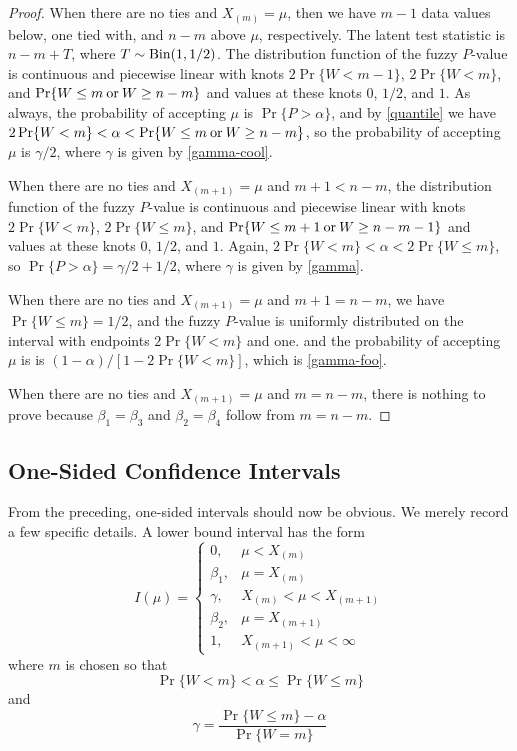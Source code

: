 \documentclass{article}
\newcommand{\BinomialDis}{\text{\upshape Bin}}
\newcommand{\opor}{\mathbin{\rm or}}
\begin{document}
\begin{proof}
When there are no ties and $X_{(m)} = \mu$,
then we have $m - 1$ data values below, one tied with, and $n - m$
above $\mu$, respectively.
The latent test statistic is $n - m + T$,
where $T \sim \BinomialDis(1, 1 / 2)$.
The distribution function of the fuzzy $P$-value is continuous and
piecewise linear with knots $2 \Pr \{ W < m - 1 \}$, $2 \Pr \{ W < m \}$,
and $\Pr \{ W \le m \opor W \ge n - m \}$ and values at these knots
$0$, $1 / 2$, and $1$.
As always, the probability of accepting $\mu$ is $\Pr \{ P > \alpha \}$,
and by \eqref{quantile} we have
$2 \Pr \{ W < m \} < \alpha < \Pr \{ W \le m \opor W \ge n - m \}$,
so the probability of accepting $\mu$ is $\gamma / 2$, where
$\gamma$ is given by \eqref{gamma-cool}.

When there are no ties and $X_{(m + 1)} = \mu$
and $m + 1 < n - m$,
the distribution function of the fuzzy $P$-value is continuous and
piecewise linear with knots $2 \Pr \{ W < m \}$, $2 \Pr \{ W \le m \}$,
and $\Pr \{ W \le m + 1 \opor W \ge n - m - 1 \}$ and values at these knots
$0$, $1 / 2$, and $1$.
Again, $2 \Pr \{ W < m \} < \alpha < 2 \Pr \{ W \le m \}$,
so $\Pr \{ P > \alpha \} = \gamma / 2 + 1 / 2$,
where $\gamma$ is given by \eqref{gamma}.

When there are no ties and $X_{(m + 1)} = \mu$
and $m + 1 = n - m$, we have $\Pr \{ W \le m \} = 1 / 2$,
and the fuzzy $P$-value is uniformly distributed on the interval
with endpoints $2 \Pr \{ W < m \}$ and one.
and the probability of accepting $\mu$ is
is $(1 - \alpha) / [1 - 2 \Pr\{W < m\}]$, which is \eqref{gamma-foo}.

When there are no ties and $X_{(m + 1)} = \mu$
and $m = n - m$, there is nothing to prove because $\beta_1 = \beta_3$
and $\beta_2 = \beta_4$ follow from $m = n - m$.
\end{proof}

\subsection{One-Sided Confidence Intervals}

From the preceding, one-sided intervals should now be obvious.
We merely record a few specific details.  A lower bound interval
has the form
\begin{equation} \label{non-degenerate-low}
   I(\mu)
   =
   \begin{cases}
   0, & \mu < X_{(m)}
   \\
   \beta_1, & \mu = X_{(m)}
   \\
   \gamma, & X_{(m)} < \mu < X_{(m + 1)}
   \\
   \beta_2, & \mu = X_{(m + 1)}
   \\
   1, & X_{(m + 1)} < \mu < \infty
   \end{cases}
\end{equation}
where $m$ is chosen so that
\begin{equation} \label{quantile-low}
   \Pr \{ W < m \} < \alpha \le \Pr \{ W \le m \}
\end{equation}
and
\begin{equation} \label{gamma-low}
   \gamma = \frac{\Pr \{ W \le m \} - \alpha}{\Pr \{ W = m \}}
\end{equation}
\end{document}
